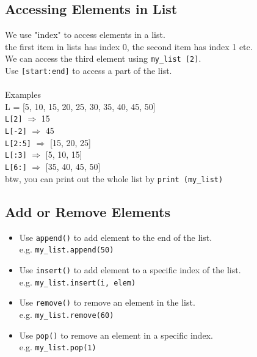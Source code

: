\documentclass[12pt]{article}
\begin{document}
\begin{CJK*}{UTF8}{bkai}
\subsection{Accessing Elements in List}
We use "index" to access elements in a list. \\
the first item in lists has index 0, the second item has index 1 etc. \\
We can access the third element using \texttt{my\_list [2]}. \\
Use \texttt{[start:end]} to access a part of the list. \\ \\
{\large Examples} \\
L = [5, 10, 15, 20, 25, 30, 35, 40, 45, 50] \\
\texttt{L[2]} $\Rightarrow$ 15 \\
\texttt{L[-2]} $\Rightarrow$ 45 \\
\texttt{L[2:5]} $\Rightarrow$ [15, 20, 25] \\
\texttt{L[:3]} $\Rightarrow$ [5, 10, 15] \\
\texttt{L[6:]} $\Rightarrow$ [35, 40, 45, 50] \\

btw, you can print out the whole list by \texttt{print (my\_list)}

\subsection{Add or Remove Elements}
\begin{itemize}
    \item Use \texttt{append()} to add element to the end of the list. \\
          e.g. \texttt{my\_list.append(50)} 
    \item Use \texttt{insert()} to add element to a specific index of the list. \\
          e.g. \texttt{my\_list.insert(i, elem)}
    \item Use \texttt{remove()} to remove an element in the list. \\
          e.g. \texttt{my\_list.remove(60)}
    \item Use \texttt{pop()} to remove an element in a specific index. \\
          e.g. \texttt{my\_list.pop(1)}
\end{itemize}


\end{CJK*}
\end{document}
